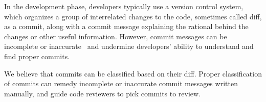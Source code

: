 

In the development phase, developers typically use a version control system,
which organizes a group of interrelated changes to the code, sometimes called diff, as a commit, along with a commit message explaining the rational behind the changes or other useful information.
However, commit messages can be incomplete or inaccurate~\cite{buse2010automatically} and undermine developers' ability to understand and find proper commits.

We believe that commits can be classified based on their diff.
Proper classification of commits can remedy incomplete or inaccurate commit messages written manually, and
guide code reviewers to pick commits to review.



